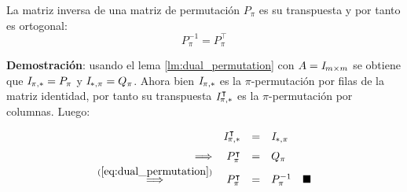 \begin{lemma}\label{lm:inverse_permutation}
	La matriz inversa de una matriz de permutaci\'on $P_\pi$ es su transpuesta y por tanto es ortogonal:
	\begin{equation}
		P_\pi^{-1} = P_\pi^\intercal
	\end{equation}
\end{lemma}
\textbf{Demostraci\'on}: usando el lema \ref{lm:dual_permutation} con $A = \mathbb{\mathit{I}}_{m \times m}$ se obtiene que $\mathbb{\mathit{I}}_{\pi,\ast} = P_\pi$ y $\mathbb{\mathit{I}}_{\ast,\pi} = Q_\pi$. Ahora bien $\mathbb{\mathit{I}}_{\pi,\ast}$ es la $\pi$-permutaci\'on por filas de la matriz identidad, por tanto su transpuesta $\mathbb{\mathit{I}}_{\pi,\ast}^\intercal$ es la $\pi$-permutaci\'on por columnas. Luego:
\begin{equation*}
	\def\arraystretch{1.5}
	\begin{array}{rrcl}
		&\I_{\pi,\ast}^\intercal &=& \I_{\ast,\pi}\\
		\Longrightarrow&P_\pi^\intercal &=& Q_\pi\\
		\overset{(\ref{eq:dual_permutation})}{\Longrightarrow}&P_\pi^\intercal &=& P_\pi^{-1} \quad\blacksquare\\
	\end{array}
\end{equation*}
